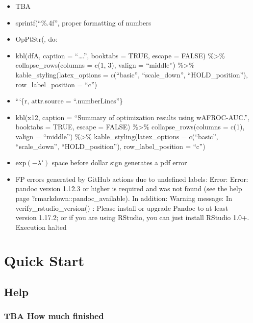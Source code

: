 \documentclass[
]{book}
\providecommand{\tightlist}{%
  \setlength{\itemsep}{0pt}\setlength{\parskip}{0pt}}
\begin{document}
\begin{itemize}
\tightlist
\item
  TBA
\item
  sprintf(``\%.4f'', proper formatting of numbers
\item
  OpPtStr(, do:
\item
  kbl(dfA, caption = ``\ldots.'', booktabs = TRUE, escape = FALSE) \%\textgreater\% collapse\_rows(columns = c(1, 3), valign = ``middle'') \%\textgreater\% kable\_styling(latex\_options = c(``basic'', ``scale\_down'', ``HOLD\_position''), row\_label\_position = ``c'')
\item
  ```\{r, attr.source = ``.numberLines''\}
\item
  kbl(x12, caption = ``Summary of optimization results using wAFROC-AUC.'', booktabs = TRUE, escape = FALSE) \%\textgreater\% collapse\_rows(columns = c(1), valign = ``middle'') \%\textgreater\% kable\_styling(latex\_options = c(``basic'', ``scale\_down'', ``HOLD\_position''), row\_label\_position = ``c'')
\item
  \(\text{exp} \left ( -\lambda' \right )\) space before dollar sign generates a pdf error
\item
  FP errors generated by GitHub actions due to undefined labels:
  Error: Error: pandoc version 1.12.3 or higher is required and was not found (see the help page ?rmarkdown::pandoc\_available).
  In addition: Warning message:
  In verify\_rstudio\_version() :
  Please install or upgrade Pandoc to at least version 1.17.2; or if you are using RStudio, you can just install RStudio 1.0+.
  Execution halted
\end{itemize}

\hypertarget{part-quick-start}{%
\part*{Quick Start}\label{part-quick-start}}

\hypertarget{quick-start-help}{%
\chapter{Help}\label{quick-start-help}}

\hypertarget{quick-start-help-how-much-finished}{%
\section{TBA How much finished}\label{quick-start-help-how-much-finished}}
\end{document}
